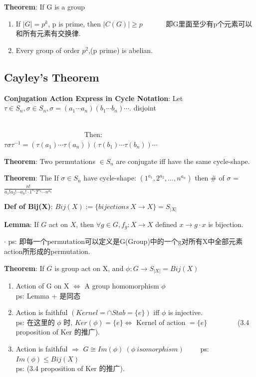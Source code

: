 \documentclass[11pt]{article}
\begin{document}
\textbf{Theorem}: If G is a group
\begin{enumerate}[itemsep=-2pt, topsep=-2pt]
    \item If $|G|=p^k$, p is prime, then $|C(G)|\geq p$ \ \ \ \ \ \ 即G里面至少有p个元素可以和所有元素有交换律.
    \item Every group of order $p^2$,(p prime) is abelian.
\end{enumerate}

\subsection{Cayley's Theorem}

\textbf{Conjugation Action Express in Cycle Notation}: Let $\tau\in S_n,\sigma\in S_n,\sigma=(a_1\cdots a_n)(b_1\cdots b_n)\cdots$. disjoint

\ \ \ \ \ \ \ \ \ \ \ \ \ \ \ \ \ \ \ \ \ \ \ \ \ \ \ \ \ \ \ \ \ \ \ \ \ \ \ \ \ \ \ \ \ \ \ \ \ \ \ \ \ \ \ \ \ \ \ \ \ \ \ \ \ \ \ \ \ \ \ \ \ \ \ \ \ \ \ \ \ \ \ \ \ \ \ \ \ \ \ \ \ \ \ Then: $\tau\sigma\tau^{-1}=(\tau(a_1)\cdots \tau(a_n))(\tau(b_1)\cdots \tau(b_n))\cdots$

\textbf{Theorem}: Two permutations $\in S_n$ are conjugate iff have the same cycle-shape.

\textbf{Theorem}: The If $\sigma\in S_n$ have cycle-shape: $(1^{a_1},2^{a_2},...,n^{a_n})$ then \# of $\sigma$ = $\frac{n!}{a_1!a_2!\cdots a_n!\cdot 1^{a_1}2^{a_2}\cdots n^{a_n}}$

\textbf{Def of Bij(X)}: $Bij(X):=\{bijections \ X\to X\}=S_{|X|}$

\textbf{Lemma}: If $G$ act on $X$, then $\forall g\in G,f_g:X\to X$ defined $x\to g\cdot x$ is bijection.

$\cdot$ ps: 即每一个permutation可以定义是G(Group)中的一个g对所有X中全部元素action所形成的permutation.

\textbf{Theorem}: If $G$ is group act on X, and $\phi:G\to S_{|X|}=Bij(X)$
\begin{enumerate}[itemsep=-2pt, topsep=-2pt]
    \item Action of G on X $\Leftrightarrow$ A group homomorphism $\phi$
    \\ ps: Lemma + 是同态
    \item Action is faithful $(Kernel=\cap Stab=\{e\})$ iff $\phi$ is injective.
    \\ ps: 在这里的 $\phi$ 时, $Ker(\phi)=\{e\}\Leftrightarrow$ Kernel of action $=\{e\}$ \ \ \ \ \ \ \ \ (3.4 proposition of Ker 的推广). 
    \item Action is faithful $\Rightarrow$ $G\cong Im(\phi) \ (\phi \ isomorphism)$ \ \ \ \ ps: $Im(\phi)\leq Bij(X)$
    \\ ps: (3.4 proposition of Ker 的推广). 
\end{enumerate}
\end{document}
